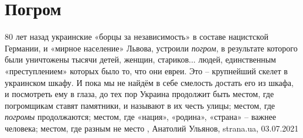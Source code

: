  
 
 
 
 
\chapter{Погром}
\label{sec:slova.pogrom}

80 лет назад украинские «борцы за независимость» в составе нацистской Германии,
и «мирное население» Львова, устроили \emph{погром}, в результате которого были
уничтожены тысячи детей, женщин, стариков... людей, единственным
«преступлением» которых было то, что они евреи.
Это – крупнейший скелет в украинском шкафу. И пока мы не найдём в себе смелость
достать его из шкафа, и посмотреть ему в глаза, до тех пор Украина продолжит
быть местом, где погромщикам ставят памятники, и называют в их честь улицы;
местом, где \emph{погромы} продолжаются; местом, где «нация», «родина», «страна» –
важнее человека; местом, где разным не место
, 
Анатолий Ульянов, strana.ua, 03.07.2021
